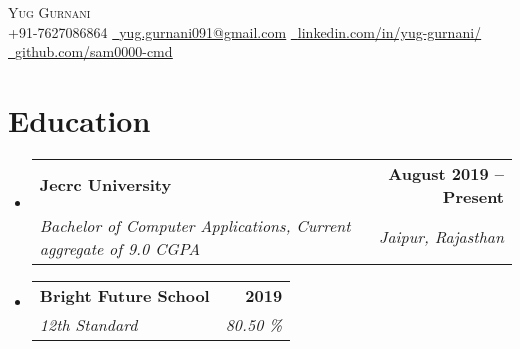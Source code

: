 \documentclass[letterpaper,11pt]{article}
\makeatletter
\newcommand{\resumeSubheading}[4]{
  \vspace{-2pt}\item
    \begin{tabular*}{1.0\textwidth}[t]{l@{\extracolsep{\fill}}r}
      \textbf{#1} & \textbf{\small #2} \\
      \textit{\small#3} & \textit{\small #4} \\
    \end{tabular*}\vspace{-7pt}
}
\newcommand{\resumeSubHeadingListStart}{\begin{itemize}[leftmargin=0.0in, label={}]}
\newcommand{\resumeSubHeadingListEnd}{\end{itemize}}
\makeatother
\begin{document}

\begin{center}
    {\Huge \scshape Yug Gurnani} \\ \vspace{1pt}
    \small \raisebox{-0.1\height} +91-7627086864 \textbar  \href{mailto:yug.gurnani091@gmail.com}{\raisebox{-0.2\height}\  \underline{yug.gurnani091@gmail.com}} \textbar 
    \href{https://www.linkedin.com/in/yug-gurnani-2595121aa/}{\raisebox{-0.2\height}\ \underline{linkedin.com/in/yug-gurnani/}} \textbar
    \href{https://github.com/sam0000-cmd}{\raisebox{-0.2\height}\ \underline{github.com/sam0000-cmd}}
    \vspace{-8pt}
\end{center}


\section{Education}
  \resumeSubHeadingListStart
    \resumeSubheading
      {Jecrc University}{August 2019 -- Present}
      {Bachelor of Computer Applications, Current aggregate of 9.0 CGPA}{Jaipur, Rajasthan}
    \resumeSubheading
      {Bright Future School}{2019}
      {12th Standard}{80.50 \%}
  \resumeSubHeadingListEnd

\end{document}
